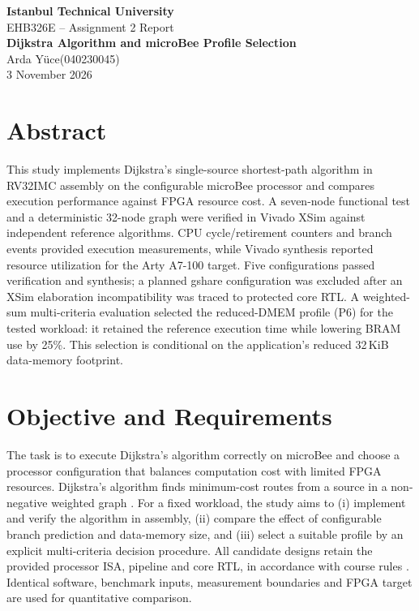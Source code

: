 \documentclass[12pt,a4paper]{article}
\newcommand{\ogrenciad}{Arda Y\"uce}
\newcommand{\ogrencino}{040230045}
\newcommand{\raporbasligi}{Dijkstra Algorithm and microBee Profile Selection}
\begin{document}
\begin{center}
{\Large\bfseries Istanbul Technical University}\\[5pt]
{\large EHB326E -- Assignment 2 Report}\\[13pt]
{\LARGE\bfseries\color{baslik}\raporbasligi}\\[11pt]
\ogrenciad\quad(\ogrencino)\\[5pt]
3 November 2026
\end{center}
\vspace{0.5em}

\section{Abstract}
This study implements Dijkstra's single-source shortest-path algorithm in RV32IMC assembly on the configurable microBee processor and compares execution performance against FPGA resource cost. A seven-node functional test and a deterministic 32-node graph were verified in Vivado XSim against independent reference algorithms. CPU cycle/retirement counters and branch events provided execution measurements, while Vivado synthesis reported resource utilization for the Arty A7-100 target. Five configurations passed verification and synthesis; a planned gshare configuration was excluded after an XSim elaboration incompatibility was traced to protected core RTL. A weighted-sum multi-criteria evaluation selected the reduced-DMEM profile (P6) for the tested workload: it retained the reference execution time while lowering BRAM use by 25\%. This selection is conditional on the application's reduced 32\,KiB data-memory footprint.

\section{Objective and Requirements}
The task is to execute Dijkstra's algorithm correctly on microBee and choose a processor configuration that balances computation cost with limited FPGA resources. Dijkstra's algorithm finds minimum-cost routes from a source in a non-negative weighted graph \cite{dijkstra1959}. For a fixed workload, the study aims to (i) implement and verify the algorithm in assembly, (ii) compare the effect of configurable branch prediction and data-memory size, and (iii) select a suitable profile by an explicit multi-criteria decision procedure. All candidate designs retain the provided processor ISA, pipeline and core RTL, in accordance with course rules \cite{course}. Identical software, benchmark inputs, measurement boundaries and FPGA target are used for quantitative comparison.
\end{document}
